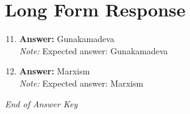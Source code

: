 \documentclass[12pt]{article}
\begin{document}
\section*{Long Form Response}
\begin{enumerate}[label=\arabic*.]
\setcounter{enumi}{10}
\item \textbf{Answer:} Gunakamadeva
\\ \textit{Note:} Expected answer: Gunakamadeva
\item \textbf{Answer:} Marxism
\\ \textit{Note:} Expected answer: Marxism
\end{enumerate}

\vfill
\noindent\textit{End of Answer Key}
\end{document}
